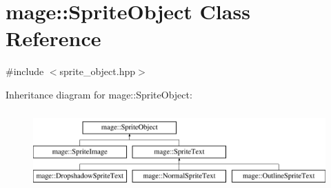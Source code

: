 \hypertarget{classmage_1_1_sprite_object}{}\section{mage\+:\+:Sprite\+Object Class Reference}
\label{classmage_1_1_sprite_object}


{\ttfamily \#include $<$sprite\+\_\+object.\+hpp$>$}

Inheritance diagram for mage\+:\+:Sprite\+Object\+:\begin{figure}[H]
\begin{center}
\leavevmode
\includegraphics[height=3.000000cm]{classmage_1_1_sprite_object}
\end{center}
\end{figure}
